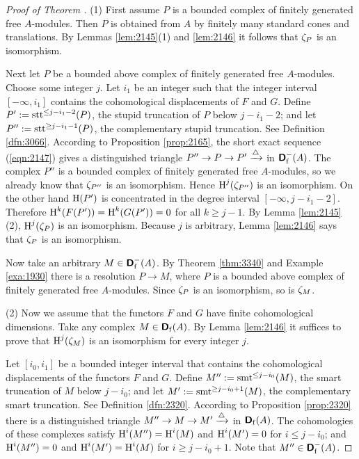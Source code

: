 \begin{proof}[Proof of Theorem \tup{\ref{thm:2135}}] \mbox{}

\smallskip \noindent
(1) First assume $P$ is a bounded complex of finitely generated free 
$A$-modules. Then $P$ is obtained from $A$ by finitely many standard cones and 
translations. By Lemmas \ref{lem:2145}(1) and \ref{lem:2146} it follows that 
$\zeta_P$ is an isomorphism. 

Next let $P$ be a bounded above complex of finitely generated free $A$-modules.
Choose some integer $j$. 
Let $i_1$ be an integer such that the integer interval $[-\infty, i_1]$ 
contains the cohomological displacements of $F$ and $G$. 
Define $P' := \operatorname{stt}^{\leq j - i_1 - 2}(P)$, the stupid truncation of $P$ 
below $j - i_1 - 2$; and let $P'' := \operatorname{stt}^{\geq j - i_1 - 1}(P)$, the 
complementary  stupid truncation. See Definition \ref{dfn:3066}. 
According to Proposition \ref{prop:2165}, the short exact 
sequence (\ref{eqn:2147}) 
gives a distinguished triangle 
$P'' \to P \to P' \xrightarrow{\triangle}$ 
in $\boldsymbol{\mathsf{D}}^{-}_{\mathrm{f}}(A)$. The complex $P''$ is a bounded complex of 
finitely 
generated free $A$-modules, so we already know that $\zeta_{P''}$ is an 
isomorphism. Hence $\operatorname{H}^j(\zeta_{P''})$ is an isomorphism.
On the other hand $\operatorname{H}(P')$ is concentrated in the degree interval 
$[-\infty, j - i_1 - 2]$. Therefore 
$\operatorname{H}^{k}(F(P')) = \operatorname{H}^k(G(P')) = 0$ for all 
$k \geq j - 1$. By Lemma \ref{lem:2145}(2), $\operatorname{H}^j(\zeta_P)$ is an 
isomorphism. Because $j$ is arbitrary, Lemma \ref{lem:2146} says that 
$\zeta_{P}$ is an isomorphism. 

Now take an arbitrary $M \in \boldsymbol{\mathsf{D}}^-_{\mathrm{f}}(A)$.
By Theorem \ref{thm:3340} and Example \ref{exa:1930} there is a 
resolution $P \to M$, where $P$ is a bounded above complex of finitely 
generated free $A$-modules. Since $\zeta_P$ is an isomorphism, so is $\zeta_M$. 

\medskip \noindent
(2) Now we assume that the functors $F$ and $G$ have finite cohomological 
dimensions. Take any complex $M \in \boldsymbol{\mathsf{D}}_{\mathrm{f}}(A)$. 
By Lemma \ref{lem:2146} it suffices to prove 
that $\operatorname{H}^j(\zeta_{M})$ is an isomorphism for every integer $j$. 

Let $[i_0, i_1]$ be a bounded integer interval that contains the 
cohomological displacements of the functors $F$ and $G$. 
Define $M'' := \operatorname{smt}^{\leq j - i_0}(M)$, the smart truncation of $M$ 
below $j - i_0$; and let $M' := \operatorname{smt}^{\geq j - i_0 + 1}(M)$, the 
complementary smart truncation. See Definition \ref{dfn:2320}. 
According to Proposition \ref{prop:2320}
there is a distinguished triangle
$M'' \to M \to M' \xrightarrow{\triangle}$
in $\boldsymbol{\mathsf{D}}_{\mathrm{f}}(A)$. 
The cohomologies of these complexes satisfy 
$\operatorname{H}^i(M'') = \operatorname{H}^i(M)$ and 
$\operatorname{H}^i(M') = 0$ for $i \leq j - i_0$; and 
$\operatorname{H}^i(M'') = 0$ and $\operatorname{H}^i(M') = \operatorname{H}^i(M)$ for 
$i \geq j - i_0 + 1$. 
Note that $M'' \in \boldsymbol{\mathsf{D}}^-_{\mathrm{f}}(A)$. 


\end{proof}
